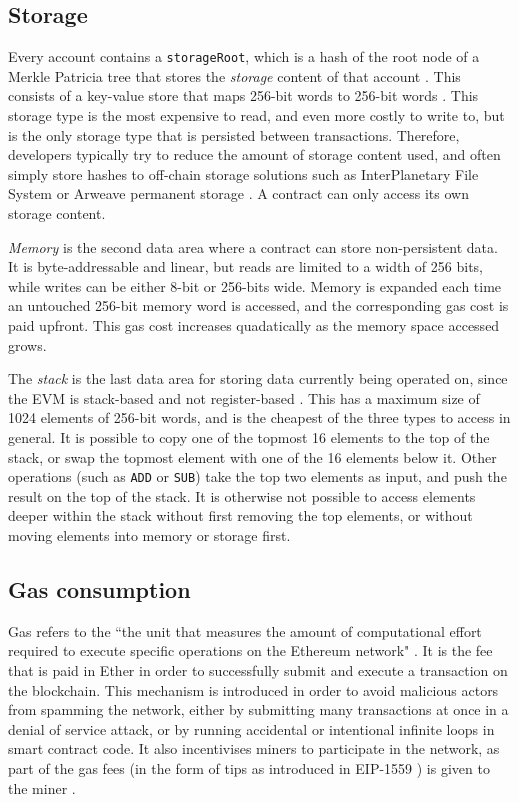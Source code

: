 \subsection{Storage}
\label{section:storage}
Every account contains a \texttt{storageRoot}, which is a hash of the root node of a Merkle
Patricia tree that stores the \textit{storage} content of that account \cite{ethereumyellowpaper}.
This consists of a key-value store that maps 256-bit words to 256-bit words \cite{solidityevm}.
This storage type is the most expensive to read, and even more costly to write to, but is the
only storage type that is persisted between transactions. Therefore, developers typically try 
to reduce the amount of storage content used, and often simply store hashes to off-chain storage
solutions such as InterPlanetary File System \cite{ipfs} or Arweave permanent storage \cite{arweave}. A contract
can only access its own storage content.

\textit{Memory} is the second data area where a contract can store non-persistent data. It is
byte-addressable and linear, but reads are limited to a width of 256 bits, while writes
can be either 8-bit or 256-bits wide. \cite{solidityevm} Memory is expanded each time an untouched 256-bit
memory word is accessed, and the corresponding gas cost is paid upfront. This gas cost increases
quadatically as the memory space accessed grows.

The \textit{stack} is the last data area for storing data currently being operated on, since
the EVM is stack-based and not register-based \cite{solidityevm}. This has a maximum
size of 1024 elements of 256-bit words, and is the cheapest of the three types to access in general. 
It is possible to copy one of the topmost 16 elements
to the top of the stack, or swap the topmost element with one of the 16 elements below it.
Other operations (such as \texttt{ADD} or \texttt{SUB}) take the top two elements as input,
and push the result on the top of the stack. It is otherwise not possible to access elements
deeper within the stack without first removing the top elements, or without moving elements
into memory or storage first.

\subsection{Gas consumption}
\label{evm:gas}
Gas refers to the ``the unit that measures the amount of computational effort required 
to execute specific operations on the Ethereum network" \cite{ethgas}. It is the fee
that is paid in Ether in order to successfully submit and execute a transaction 
on the blockchain. This mechanism is introduced in order to avoid malicious actors
from spamming the network, either by submitting many transactions at once in a denial
of service attack, or by running accidental or intentional infinite loops in smart
contract code. It also incentivises miners to participate in the network, as part of
the gas fees (in the form of tips as introduced in EIP-1559 \cite{eip1559}) is given to the miner .

